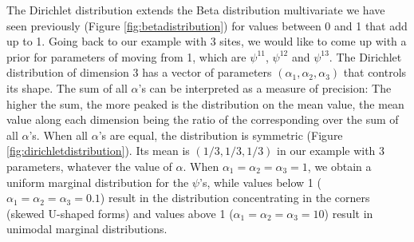 \documentclass[
  12pt,
]{krantz}
\begin{document}
The Dirichlet distribution extends the Beta distribution multivariate we have seen previously (Figure \ref{fig:betadistribution}) for values between 0 and 1 that add up to 1. Going back to our example with 3 sites, we would like to come up with a prior for parameters of moving from 1, which are \(\psi^{11}\), \(\psi^{12}\) and \(\psi^{13}\). The Dirichlet distribution of dimension 3 has a vector of parameters \((\alpha_1, \alpha_2, \alpha_3)\) that controls its shape. The sum of all \(\alpha\)'s can be interpreted as a measure of precision: The higher the sum, the more peaked is the distribution on the mean value, the mean value along each dimension being the ratio of the corresponding over the sum of all \(\alpha\)'s. When all \(\alpha\)'s are equal, the distribution is symmetric (Figure \ref{fig:dirichletdistribution}). Its mean is \((1/3, 1/3, 1/3)\) in our example with 3 parameters, whatever the value of \(\alpha\). When \(\alpha_1 = \alpha_2 = \alpha_3 = 1\), we obtain a uniform marginal distribution for the \(\psi\)'s, while values below 1 (\(\alpha_1 = \alpha_2 = \alpha_3 = 0.1\)) result in the distribution concentrating in the corners (skewed U-shaped forms) and values above 1 (\(\alpha_1 = \alpha_2 = \alpha_3 = 10\)) result in unimodal marginal distributions.
\end{document}
